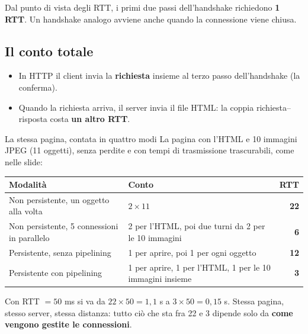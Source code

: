 Dal punto di vista degli RTT, i primi due passi dell'handshake richiedono \textbf{1 RTT}. Un
handshake analogo avviene anche quando la connessione viene chiusa.

\subsection{Il conto totale}

\begin{itemize}
    \item In HTTP il client invia la \textbf{richiesta} insieme al terzo passo dell'handshake (la conferma).
    \item Quando la richiesta arriva, il server invia il file HTML: la coppia richiesta--risposta costa
          \textbf{un altro RTT}.
\end{itemize}


\begin{esempio}{La stessa pagina, contata in quattro modi}
La pagina con l'HTML e 10 immagini JPEG (11 oggetti), senza perdite e con tempi di trasmissione
trascurabili, come nelle slide:

\begin{center}
\renewcommand{\arraystretch}{1.3}
\begin{tabular}{p{6.2cm}p{4.6cm}r}
\toprule
\textbf{Modalità} & \textbf{Conto} & \textbf{RTT} \\
\midrule
Non persistente, un oggetto alla volta & $2 \times 11$ & \textbf{22} \\
Non persistente, 5 connessioni in parallelo & 2 per l'HTML, poi due turni da 2 per le 10 immagini & \textbf{6} \\
Persistente, senza pipelining & 1 per aprire, poi 1 per ogni oggetto & \textbf{12} \\
Persistente con pipelining & 1 per aprire, 1 per l'HTML, 1 per le 10 immagini insieme & \textbf{3} \\
\bottomrule
\end{tabular}
\end{center}

Con RTT $= 50$ ms si va da $22 \times 50 = 1{,}1$ s a $3 \times 50 = 0{,}15$ s. Stessa pagina, stesso server,
stessa distanza: tutto ciò che sta fra 22 e 3 dipende solo da \textbf{come vengono gestite le connessioni}.
\end{esempio}

